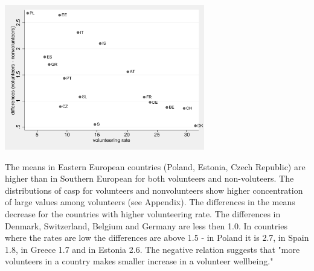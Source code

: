 \documentclass[10pt, letterpaper]{article}
\begin{document}
\begin{spacing}{1.4}
%	 


\begin{table}[H]
\begin{spacing}{.9} 
\begin{scriptsize} 
	 
      \label{CaspTtest} 
\end{scriptsize}
\end{spacing}
\end{table}

\begin{center}
\includegraphics[height=2.5in]{abs_casp.pdf}
\label{fig:casp}
\end{center}

The means in Eastern European countries (Poland, Estonia, Czech Republic) are higher than in Southern European for both volunteers and non-voluteers. The distributions of casp for volunteers and nonvolunteers show higher concentration of large values among volunteers (see Appendix). The differences in the means decrease for the countries with higher volunteering rate.  The differences in  Denmark, Switzerland, Belgium and Germany are less then 1.0. In countries where the rates are low the differences are above 1.5 - in Poland it is 2.7, in Spain 1.8, in Greece 1.7 and in Estonia 2.6. The negative relation suggests that "more volunteers in a country makes smaller increase in a volunteer wellbeing." 


\end{spacing}
\end{document}
